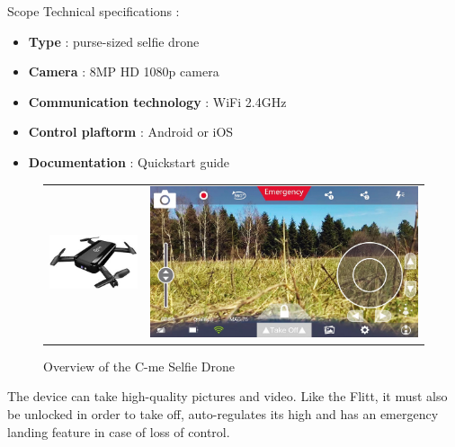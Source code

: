 \begin{chaptercover}{Scope}
Technical specifications :
\begin{itemize}[itemsep=.1cm,topsep=.1cm]
  \item \textbf{Type} : purse-sized selfie drone
  \item \textbf{Camera} : 8MP HD 1080p camera
  \item \textbf{Communication technology} : WiFi 2.4GHz
  \item \textbf{Control plaftorm} : Android or iOS
  \item \textbf{Documentation} : Quickstart guide \cite{cme-selfie-drone}
\end{itemize}

\begin{figure}[H]
  \begin{tabular}{m{5cm}m{12.3cm}}
  \centering
  \includegraphics[width=\linewidth]{figures/cme-selfie-drone} &
  \centering
  \includegraphics[width=0.65\linewidth]{figures/cme-selfie-drone-ui} \\
  \end{tabular}
  \caption{Overview of the C-me Selfie Drone}
  \label{fig:flitt-selfie-cam}
\end{figure}

The device can take high-quality pictures and video. Like the Flitt, it must also be unlocked in order to take off, auto-regulates its high and has an emergency landing feature in case of loss of control.


\end{chaptercover}
